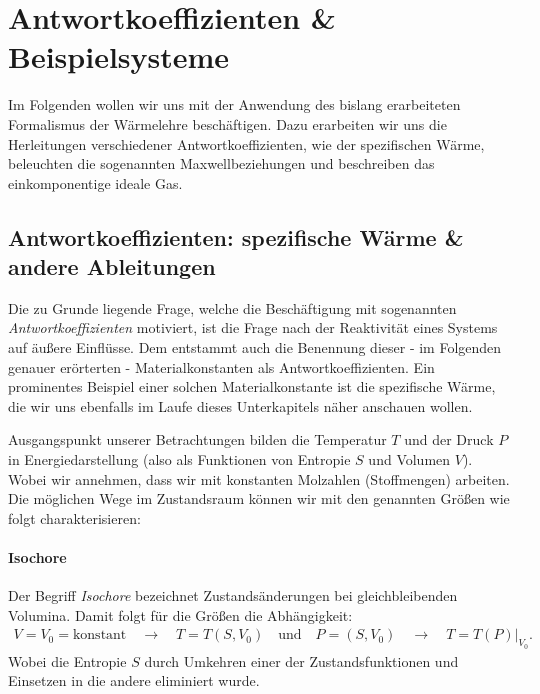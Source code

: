\section{Antwortkoeffizienten \& Beispielsysteme}
Im Folgenden wollen wir uns mit der Anwendung des bislang erarbeiteten Formalismus der Wärmelehre beschäftigen. Dazu erarbeiten wir uns die Herleitungen verschiedener Antwortkoeffizienten, wie der spezifischen Wärme, beleuchten die sogenannten Maxwellbeziehungen und beschreiben das einkomponentige ideale Gas.  
\subsection{Antwortkoeffizienten: spezifische Wärme \& andere Ableitungen}
Die zu Grunde liegende Frage, welche die Beschäftigung mit sogenannten \emph{Antwortkoeffizienten} motiviert, ist die Frage nach der Reaktivität eines Systems auf äußere Einflüsse. Dem entstammt auch die Benennung dieser - im Folgenden genauer erörterten - Materialkonstanten als Antwortkoeffizienten. 
Ein prominentes Beispiel einer solchen Materialkonstante ist die spezifische Wärme, die wir uns ebenfalls im Laufe dieses Unterkapitels näher anschauen wollen.


Ausgangspunkt unserer Betrachtungen bilden die Temperatur $T$ und der Druck $P$ in Energiedarstellung (also als Funktionen von Entropie $S$ und Volumen $V$). Wobei wir annehmen, dass wir mit konstanten Molzahlen (Stoffmengen) arbeiten.  Die möglichen Wege im Zustandsraum können wir mit den genannten Größen wie folgt charakterisieren: 


\paragraph*{Isochore}
Der Begriff \emph{Isochore} bezeichnet Zustandsänderungen bei gleichbleibenden Volumina. Damit folgt für die Größen die Abhängigkeit: 
\begin{align*}
    V=V_0=\text{konstant}\quad\rightarrow\quad T=T(S,V_0) \quad\text{und}\quad P=(S,V_0) \quad\rightarrow\quad T=T(P)|_{V_0}.
\end{align*}
Wobei die Entropie $S$ durch Umkehren einer der Zustandsfunktionen und Einsetzen in die andere eliminiert wurde.


